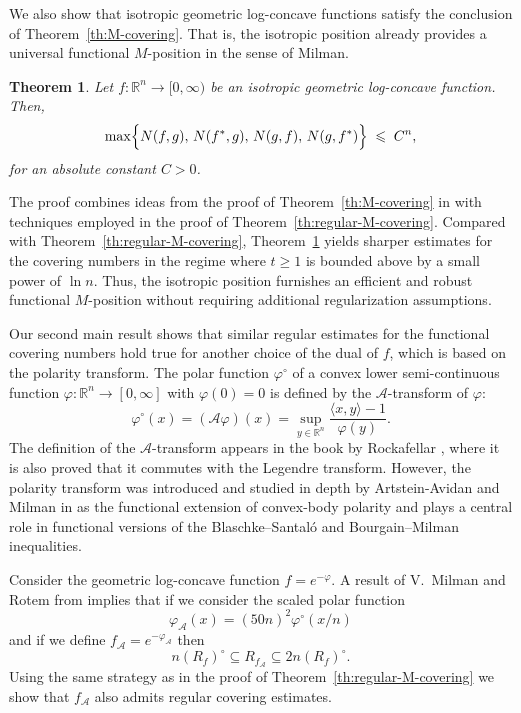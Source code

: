 \documentclass[11pt,leqno]{article}
\newtheorem{theorem}{Theorem}[section]
\theoremstyle{definition}
\theoremstyle{remark}
\numberwithin{equation}{section}
\newcommand{\ls}{\leqslant}
\newcommand{\gr}{\geqslant}
\begin{document}
\smallskip

We also show that isotropic geometric log-concave functions satisfy the conclusion of 
Theorem~\ref{th:M-covering}. That is, the isotropic position already provides a universal functional $M$-position in the sense of Milman.


\begin{theorem}\label{th:isotropic-milman}
Let $f:\mathbb{R}^{n}\to[0,\infty)$ be an isotropic geometric log-concave function.
Then,
$$\max\Bigl\{N(f,g),\, N(f^{\ast},g),\, N(g,f),\, N(g,f^{\ast})\Bigr\} \;\ls\; C^{n},$$
for an absolute constant $C>0$.
\end{theorem}

The proof combines ideas from the proof of Theorem~\ref{th:M-covering} 
in \cite{Artstein-Slomka-2021} with techniques employed in the proof of 
Theorem~\ref{th:regular-M-covering}.  Compared with Theorem~\ref{th:regular-M-covering}, 
Theorem~\ref{th:isotropic-milman} yields sharper estimates for the covering numbers 
in the regime where $t\gr 1$ is bounded above by a small power of $\ln n$.  
Thus, the isotropic position furnishes an efficient and robust functional 
$M$-position without requiring additional regularization assumptions.

\medskip 

Our second main result shows that similar regular estimates for the functional covering numbers hold true
for another choice of the dual of $f$, which is based on the polarity transform. 
The polar function $\varphi^{\circ}$ of a convex lower semi-continuous function $\varphi:\mathbb{R}^n\to [0,\infty]$
with $\varphi(0)=0$ is defined by the $\mathcal{A}$-transform of $\varphi$:
$$\varphi^{\circ}(x)=(\mathcal{A}\varphi)(x)=\sup_{y\in\mathbb{R}^n}\frac{\langle x,y\rangle -1}{\varphi(y)}.$$
The definition of the $\mathcal{A}$-transform appears in the book by Rockafellar \cite[page~136]{Rockafellar-book}, where it is 
also proved that it commutes with the Legendre transform. However, the polarity transform was introduced 
and studied in depth by Artstein-Avidan and Milman in \cite{Artstein-VMilman-2011} as the functional
extension of convex-body polarity and plays a central role in functional versions of the 
Blaschke--Santal\'{o} and Bourgain--Milman inequalities.

Consider the geometric log-concave function $f=e^{-\varphi}$. A result of V.~Milman and Rotem from \cite{VMilman-Rotem-2013}
implies that if we consider the scaled polar function
$$\varphi_{\mathcal{A}}(x)=(50n)^2\varphi^{\circ}(x/n)$$
and if we define $f_{\mathcal{A}}=e^{-\varphi_{\mathcal{A}}}$ then
$$n(R_f)^{\circ}\subseteq R_{f_{\mathcal{A}}}\subseteq 2n(R_f)^{\circ}.$$
Using the same strategy as in the proof of Theorem~\ref{th:regular-M-covering} we show that
$f_{\mathcal{A}}$ also admits regular covering estimates.
\end{document}
